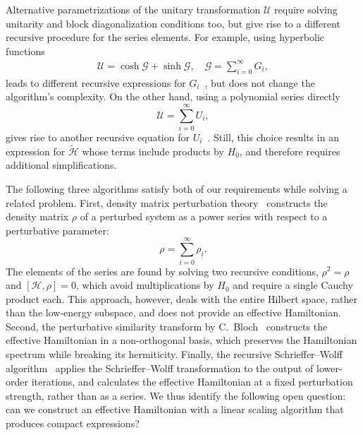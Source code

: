 Alternative parametrizations of the unitary transformation $\mathcal{U}$ require solving unitarity and block diagonalization conditions too, but give rise to a different recursive procedure for the series elements.
For example, using hyperbolic functions
%
\begin{gather}
\mathcal{U} = \cosh{\mathcal{G}} + \sinh{\mathcal{G}}, \quad
\mathcal{G} = \sum_{i=0}^{\infty} G_i,
\end{gather}
%
leads to different recursive expressions for $G_i$~\cite{Shavitt_1980}, but does not change the algorithm's complexity.
On the other hand, using a polynomial series directly
%
\begin{equation}
\mathcal{U} = \sum_{i=0}^{\infty} U_i,
\end{equation}
%
gives rise to another recursive equation for $U_i$~\cite{Van_Vleck_1929, Lowdin_1962, Klein_1974, Suzuki_1983}.
Still, this choice results in an expression for $\tilde{\mathcal{H}}$ whose terms include products by $H_0$, and therefore requires additional simplifications.

The following three algorithms satisfy both of our requirements while solving a related problem.
First, density matrix perturbation theory~\cite{McWeeny_1962,McWeeny_1968,Truflandier_2020} constructs the density
matrix $\mathcal{\rho}$ of a perturbed system as a power series with respect to a perturbative parameter:
%
\begin{equation}
  \mathcal{\rho} = \sum_{i=0}^{\infty} \rho_i.
\end{equation}
%
The elements of the series are found by solving two recursive conditions, $\mathcal{\rho}^2 = \mathcal{\rho}$ and $[\mathcal{H}, \mathcal{\rho}]=0$, which avoid multiplications by $H_0$ and require a single Cauchy product each.
This approach, however, deals with the entire Hilbert space, rather than the low-energy subspace, and does not provide an effective Hamiltonian.
Second, the perturbative similarity transform by C.~Bloch~\cite{Bloch_1958,Bravyi_2011} constructs the effective Hamiltonian in a non-orthogonal basis, which preserves the Hamiltonian spectrum while breaking its hermiticity.
Finally, the recursive Schrieffer--Wolff algorithm~\cite{Li_2022} applies the Schrieffer--Wolff transformation to the output of lower-order iterations, and calculates the effective Hamiltonian at a fixed perturbation strength, rather
than as a series.
We thus identify the following open question: can we construct an effective Hamiltonian with a linear scaling algorithm that produces compact expressions?

